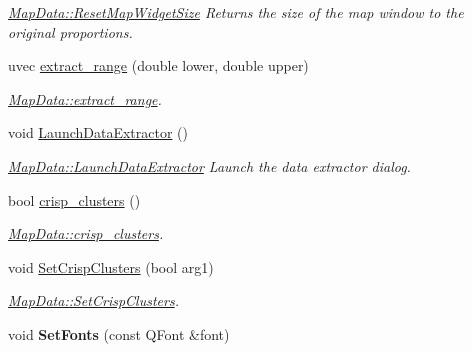 \begin{DoxyCompactItemize}
\begin{DoxyCompactList}\small\item\em \hyperlink{class_map_data_a795493559eec5070c21ba9561af583d9}{Map\+Data\+::\+Reset\+Map\+Widget\+Size} Returns the size of the map window to the original proportions. \end{DoxyCompactList}\item 
uvec \hyperlink{class_map_data_a9a36051c2e38bc6dd21c1452cabdf56d}{extract\+\_\+range} (double lower, double upper)
\begin{DoxyCompactList}\small\item\em \hyperlink{class_map_data_a9a36051c2e38bc6dd21c1452cabdf56d}{Map\+Data\+::extract\+\_\+range}. \end{DoxyCompactList}\item 
\hypertarget{class_map_data_a2788d8eab92222a00724772fdd997b1f}{void \hyperlink{class_map_data_a2788d8eab92222a00724772fdd997b1f}{Launch\+Data\+Extractor} ()}\label{class_map_data_a2788d8eab92222a00724772fdd997b1f}

\begin{DoxyCompactList}\small\item\em \hyperlink{class_map_data_a2788d8eab92222a00724772fdd997b1f}{Map\+Data\+::\+Launch\+Data\+Extractor} Launch the data extractor dialog. \end{DoxyCompactList}\item 
bool \hyperlink{class_map_data_a769fa8b15df27ed067a951ea1427c894}{crisp\+\_\+clusters} ()
\begin{DoxyCompactList}\small\item\em \hyperlink{class_map_data_a769fa8b15df27ed067a951ea1427c894}{Map\+Data\+::crisp\+\_\+clusters}. \end{DoxyCompactList}\item 
void \hyperlink{class_map_data_a8d9e7f2a19b116370354f06150af1cbe}{Set\+Crisp\+Clusters} (bool arg1)
\begin{DoxyCompactList}\small\item\em \hyperlink{class_map_data_a8d9e7f2a19b116370354f06150af1cbe}{Map\+Data\+::\+Set\+Crisp\+Clusters}. \end{DoxyCompactList}\item 
\hypertarget{class_map_data_a60100b519b8e081cad23925043b3c024}{void {\bfseries Set\+Fonts} (const Q\+Font \&font)}\label{class_map_data_a60100b519b8e081cad23925043b3c024}

\end{DoxyCompactItemize}
